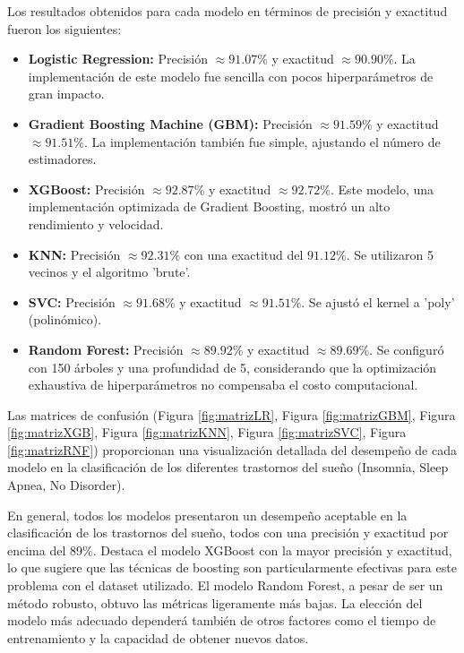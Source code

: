 \documentclass{replab}
\begin{document}
Los resultados obtenidos para cada modelo en términos de precisión y exactitud fueron los siguientes:

\begin{itemize}
    \item \textbf{Logistic Regression:} Precisión $\approx 91.07\%$ y exactitud $\approx 90.90\%$. La implementación de este modelo fue sencilla con pocos hiperparámetros de gran impacto.
    \item \textbf{Gradient Boosting Machine (GBM):} Precisión $\approx 91.59\%$ y exactitud $\approx 91.51\%$. La implementación también fue simple, ajustando el número de estimadores.
    \item \textbf{XGBoost:} Precisión $\approx 92.87\%$ y exactitud $\approx 92.72\%$. Este modelo, una implementación optimizada de Gradient Boosting, mostró un alto rendimiento y velocidad.
    \item \textbf{KNN:} Precisión $\approx 92.31\%$ con una exactitud del $91.12\%$. Se utilizaron 5 vecinos y el algoritmo 'brute'.
    \item \textbf{SVC:} Precisión $\approx 91.68\%$ y exactitud $\approx 91.51\%$. Se ajustó el kernel a 'poly' (polinómico).
    \item \textbf{Random Forest:} Precisión $\approx 89.92\%$ y exactitud $\approx 89.69\%$. Se configuró con 150 árboles y una profundidad de 5, considerando que la optimización exhaustiva de hiperparámetros no compensaba el costo computacional.
\end{itemize}

Las matrices de confusión (Figura \ref{fig:matrizLR}, Figura \ref{fig:matrizGBM}, Figura \ref{fig:matrizXGB}, Figura \ref{fig:matrizKNN}, Figura \ref{fig:matrizSVC}, Figura \ref{fig:matrizRNF}) proporcionan una visualización detallada del desempeño de cada modelo en la clasificación de los diferentes trastornos del sueño (Insomnia, Sleep Apnea, No Disorder).

En general, todos los modelos presentaron un desempeño aceptable en la clasificación de los trastornos del sueño, todos con una precisión y exactitud por encima del 89\%. Destaca el modelo XGBoost con la mayor precisión y exactitud, lo que sugiere que las técnicas de boosting son particularmente efectivas para este problema con el dataset utilizado. El modelo Random Forest, a pesar de ser un método robusto, obtuvo las métricas ligeramente más bajas. La elección del modelo más adecuado dependerá también de otros factores como el tiempo de entrenamiento y la capacidad de obtener nuevos datos.
\end{document}
